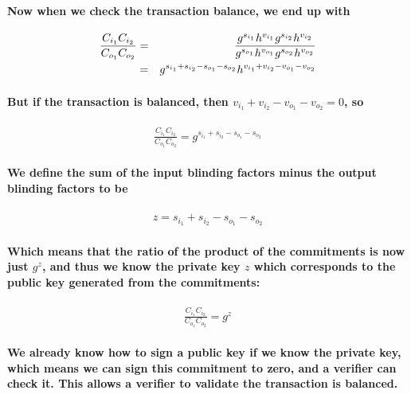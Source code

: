 \documentclass{article}
\begin{document}
\paragraph{Now when we check the transaction balance, we end up with}

\begin{eqnarray}
  \frac{C_{i_1} C_{i_2}}{C_{o_1} C_{o_2}} &=& \frac{g^{s_{i_1}} h^{v_{i_1}} g^{s_{i_2}} h^{v_{i_2}}}{g^{s_{o_1}} h^{v_{o_1}} g^{s_{o_2}} h^{v_{o_2}}}
  \cr &=& g^{s_{i_1} + s_{i_2} - s_{o_1} - s_{o_2}} h^{v_{i_1} + v_{i_2} - v_{o_1} - v_{o_2}}
\end{eqnarray}

\paragraph{But if the transaction is balanced, then $v_{i_1} + v_{i_2} - v_{o_1} - v_{o_2} =0$, so}

\begin{eqnarray}
  \frac{C_{i_1} C_{i_2}}{C_{o_1} C_{o_2}} = g^{s_{i_1} + s_{i_2} - s_{o_1} - s_{o_2}}
\end{eqnarray}

\paragraph{We define the sum of the input blinding factors minus the output blinding factors to be}

\begin{eqnarray}
  z = s_{i_1} + s_{i_2} - s_{o_1} - s_{o_2}
\end{eqnarray}

\paragraph{Which means that the ratio of the product of the commitments is now just $g^z$, and thus we know the private key $z$ which corresponds to the public key generated from the commitments:}

\begin{eqnarray}
  \frac{C_{i_1} C_{i_2}}{C_{o_1} C_{o_2}} = g^z
\end{eqnarray}

\paragraph{We already know how to sign a public key if we know the private key, which means we can sign this commitment to zero, and a verifier can check it.  This allows a verifier to validate the transaction is balanced.}
\end{document}
